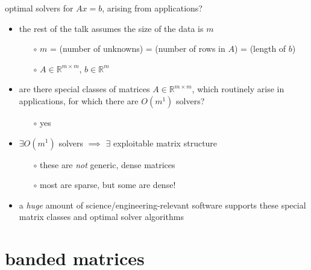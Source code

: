 \documentclass[10pt,
               svgnames,
               hyperref={colorlinks,citecolor=DeepPink4,linkcolor=FireBrick,urlcolor=Maroon},
               usepdftitle=false]{beamer}
\newcommand{\RR}{\mathbb{R}}
\begin{document}
\begin{frame}{optimal solvers for $Ax=b$, arising from applications?}

\begin{itemize}
\item \alert{the rest of the talk assumes the size of the data is $m$}
   \begin{itemize}
   \item[$\circ$] $m$ = (number of unknowns) = (number of rows in $A$) = (length of $b$)
   \item[$\circ$] $A\in\RR^{m\times m}$, $b \in \RR^m$
   \end{itemize}
\item are there special classes of matrices $A\in\RR^{m\times m}$, which routinely arise in applications, for which there are $O(m^1)$ solvers?
   \begin{itemize}
   \item[$\circ$] yes
   \end{itemize}
\item $\exists O(m^1)$ solvers $\implies$ $\exists$ exploitable matrix structure
   \begin{itemize}
   \item[$\circ$] these are \emph{not} generic, dense matrices
   \item[$\circ$] most are sparse, but some are dense!
   \end{itemize}
\item a \emph{huge} amount of science/engineering-relevant software supports these special matrix classes and optimal solver algorithms
\end{itemize}
\end{frame}


\section{banded matrices}
\end{document}
